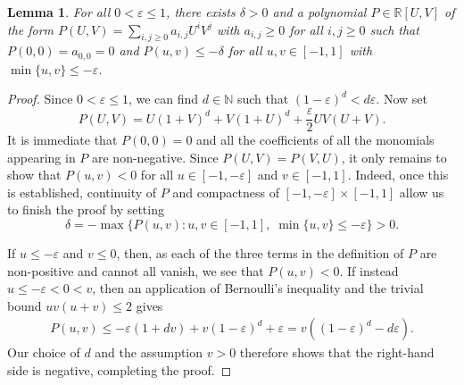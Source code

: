\documentclass[reqno,a4paper,12pt]{amsart}
\newtheorem{lemma}[theorem]{Lemma}
\theoremstyle{definition}
\theoremstyle{remark}
\def \N {\mathbb{N}}
\def \R {\mathbb{R}}
\def\eps{\varepsilon}
\begin{document}
\begin{lemma}\label{lem2}
    For all $0<\eps \leqslant 1$, there exists $\delta>0$ and a polynomial $P\in\R[U,V]$ of the form $P(U,V)=\sum_{i,j\geqslant 0}a_{i,j}U^iV^j$ with $a_{i,j}\geqslant 0$ for all $i,j\geqslant 0$ such that $P(0,0) = a_{0,0} = 0$ and $P(u,v)\leqslant - \delta$ for all $u,v\in[-1,1]$ with $\min\{u,v\}\leqslant -\eps$.
\end{lemma}
\begin{proof}
    Since $0<\eps\leqslant 1$, we can find $d\in\N$ such that $(1-\eps)^d <  d\eps $. Now set
    \begin{equation*}
        P(U,V) = U(1+V)^d + V(1+U)^d + \frac{\eps}{2}UV(U+V).
    \end{equation*}
It is immediate that $P(0,0) = 0$ and all the coefficients of all the monomials appearing in $P$ are non-negative. Since $P(U,V)=P(V,U)$, it only remains to show that $P(u,v)<0$ for all $u\in[-1,-\eps]$ and $v\in[-1,1]$. Indeed, once this is established, continuity of $P$ and compactness of $[-1,-\eps]\times[-1,1]$ allow us to finish the proof by setting
    \begin{equation*}
         \delta = - \max\{P(u,v):u,v\in[-1,1],\; \min\{u,v\}\leqslant-\eps\} > 0.
    \end{equation*}
    
    If $u\leqslant -\eps$ and $v \leqslant 0$, then, as each of the three terms in the definition of $P$ are non-positive and cannot all vanish, we see that $P(u,v)<0$. If instead $u\leqslant -\eps < 0 < v$, then an application of Bernoulli's inequality and the trivial bound $uv(u+v)\leqslant 2$ gives
    \begin{align*}
        P(u,v)\leqslant -\eps (1+dv) + v(1-\eps )^d + \eps = v ((1-\eps)^d - d\eps).
    \end{align*}
    Our choice of $d$ and the assumption $v>0$ therefore shows that the right-hand side is negative, completing the proof.
\end{proof}
\end{document}
